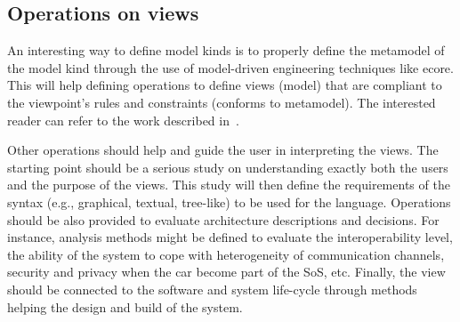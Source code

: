 %
%
%
%
%
%
%
%
%
%
%
%


\subsection{Operations on views}\label{Opns}

An interesting way to define model kinds is to properly define the metamodel of the model kind through the use of model-driven engineering techniques like ecore. This will help defining operations to define views (model) that are compliant to the viewpoint's rules and constraints (conforms to metamodel). The interested reader can refer to the work described in~\cite{MEGAF2010,MEGAF2012}.

Other operations should help and guide the user in interpreting the views. The starting point should be a serious study on understanding exactly both the users and the purpose of the views. This study will then define the requirements of the syntax (e.g., graphical, textual, tree-like) to be used for the language. 
Operations should be also provided to evaluate architecture descriptions and decisions. For instance, analysis methods might be defined to evaluate the interoperability level, the ability of the system to cope with heterogeneity of communication channels, security and privacy when the car become part of the SoS, etc.
Finally, the view should be connected to the software and system life-cycle through methods helping the design and build of the system.


